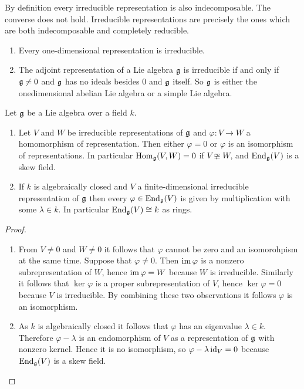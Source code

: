 \begin{rem}
 By definition every irreducible representation is also indecomposable. The converse does not hold. Irreducible representations are precisely the ones which are both indecomposable and completely reducible.
\end{rem}


\begin{expl}
 \begin{enumerate}[leftmargin=*]
  \item
   Every one-dimensional representation is irreducible.
  \item
   The adjoint representation of a Lie algebra $\mathfrak{g}$ is irreducible if and only if $\mathfrak{g} \neq 0$ and $\mathfrak{g}$ has no ideals besides $0$ and $\mathfrak{g}$ itself. So $\mathfrak{g}$ is either the onedimensional abelian Lie algebra or a simple Lie algebra.   
 \end{enumerate}
\end{expl}


\begin{lem}[Schur]
 Let $\mathfrak{g}$ be a Lie algebra over a field $k$.
 \begin{enumerate}
  \item
   Let $V$ and $W$ be irreducible representations of $\mathfrak{g}$ and $\varphi \colon V \to W$ a homomorphism of representation. Then either $\varphi = 0$ or $\varphi$ is an isomorphism of representations. In particular $\operatorname{Hom}_{\mathfrak{g}}(V,W) = 0$ if $V \ncong W$, and $\operatorname{End}_{\mathfrak{g}}(V)$ is a skew field.
  \item
   If $k$ is algebraically closed and $V$ a finite-dimensional irreducible representation of $\mathfrak{g}$ then every $\varphi \in \operatorname{End}_{\mathfrak{g}}(V)$ is given by multiplication with some $\lambda \in k$. In particular $\operatorname{End}_{\mathfrak{g}}(V) \cong k$ as rings.
 \end{enumerate}
\end{lem}
\begin{proof}
 \begin{enumerate}[leftmargin=*]
  \item
   From $V \neq 0$ and $W \neq 0$ it follows that $\varphi$ cannot be zero and an isomorohpism at the same time. Suppose that $\varphi \neq 0$. Then $\operatorname{im} \varphi$ is a nonzero subrepresentation of $W$, hence $\operatorname{im} \varphi = W$ because $W$ is irreducible. Similarly it follows that $\ker \varphi$ is a proper subrepresentation of $V$, hence $\ker \varphi = 0$ because $V$ is irreducible. By combining these two observations it follows $\varphi$ is an isomorphism.
  \item
   As $k$ is algebraically closed it follows that $\varphi$ has an eigenvalue $\lambda \in k$. Therefore $\varphi - \lambda$ is an endomorphism of $V$ as a representation of $\mathfrak{g}$ with nonzero kernel. Hence it is no isomorphism, so $\varphi - \lambda \operatorname{id}_V = 0$ because $\operatorname{End}_{\mathfrak{g}}(V)$ is a skew field.
  \qedhere
 \end{enumerate}
\end{proof}








